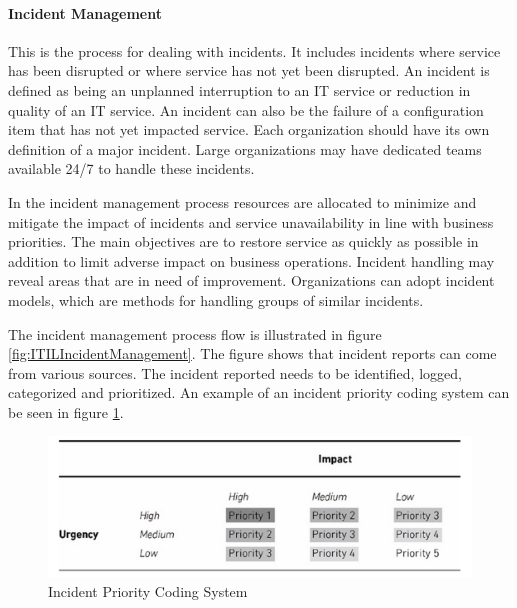 \paragraph{Incident Management}
This is the process for dealing with incidents. It includes incidents where service has been disrupted or where service has not yet been disrupted. An incident is defined as being an unplanned interruption to an IT service or reduction in quality of an IT service. An incident can also be the failure of a configuration item that has not yet impacted service. Each organization should have its own definition of a major incident. Large organizations may have dedicated teams available 24/7 to handle these incidents. 

In the incident management process resources are allocated to minimize and mitigate the impact of incidents and service unavailability in line with business priorities. The main objectives are to restore service as quickly as possible in addition to limit adverse impact on business operations. Incident handling may reveal areas that are in need of improvement. Organizations can adopt incident models, which are methods for handling groups of similar incidents.

The incident management process flow is illustrated in figure \ref{fig:ITILIncidentManagement}. The figure shows that incident reports can come from various sources. The incident reported needs to be identified, logged, categorized and prioritized. An example of an incident priority coding system can be seen in figure \ref{fig:ITILIncidentPrioritization}.


\begin{figure}[ht]
\begin{center}
\hspace{-0.2cm}\includegraphics[scale=0.4]{ITILIncidentPrioritization.png}
\caption[Incident Priority Coding System]{Incident Priority Coding System \cite{itilbok}}
\label{fig:ITILIncidentPrioritization}
\end{center}
\end{figure}

